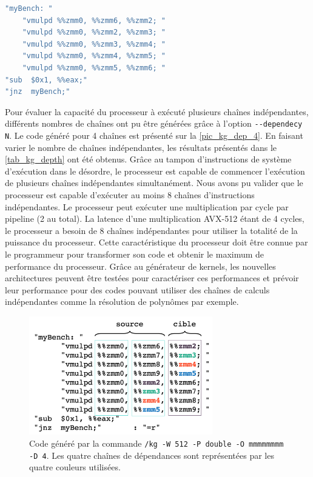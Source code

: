     
    
    
\begin{minipage}{0.97\linewidth}         \begin{lstlisting}[label=lst_dep1,language=C, caption=Code généré par la commande \texttt{/kg -W 512 -P double -O mmmmm -D 1}. Chaque instruction utilise le résultat produit par l'instruction précédente.]
"myBench: " 
	"vmulpd %%zmm0, %%zmm6, %%zmm2; "
	"vmulpd %%zmm0, %%zmm2, %%zmm3; "
	"vmulpd %%zmm0, %%zmm3, %%zmm4; "
	"vmulpd %%zmm0, %%zmm4, %%zmm5; "
	"vmulpd %%zmm0, %%zmm5, %%zmm6; "
"sub  $0x1, %%eax;"
"jnz  myBench;"
\end{lstlisting} \end{minipage}

     
    Pour évaluer la capacité du processeur à exécuté plusieurs chaînes indépendantes, différents nombres de chaînes ont pu être générées grâce à l'option \verb|--dependecy N|. Le code généré pour 4 chaînes est présenté sur la \autoref{pic_kg_dep_4}. En faisant varier le nombre de chaînes indépendantes, les résultats présentés dans le \autoref{tab_kg_depth} ont été obtenus. Grâce au tampon d'instructions de système d'exécution dans le désordre, le processeur est capable de commencer l'exécution de plusieurs chaînes indépendantes simultanément. Nous avons pu valider que le processeur est capable d'exécuter au moins 8 chaînes d'instructions indépendantes. Le processeur peut exécuter une multiplication par cycle par pipeline (2 au total). La latence d'une multiplication AVX-512 étant de 4 cycles, le processeur a besoin de 8 chaînes indépendantes pour utiliser la totalité de la puissance du processeur. Cette caractéristique du processeur doit être connue par le programmeur pour transformer son code et obtenir le maximum de performance du processeur. Grâce au générateur de kernels, les nouvelles architectures peuvent être testées pour caractériser ces performances et prévoir leur performance pour des codes pouvant utiliser des chaînes de calculs indépendantes comme la résolution de polynômes par exemple. 
    
         \begin{figure}
            \center
            \includegraphics[width=8cm]{images/kg_dep_4.png}
            \caption{\label{pic_kg_dep_4} Code généré par la commande \texttt{/kg -W 512 -P double -O mmmmmmmm -D 4}. Les quatre chaînes de dépendances sont représentées par les quatre couleurs utilisées.}
        \end{figure}

